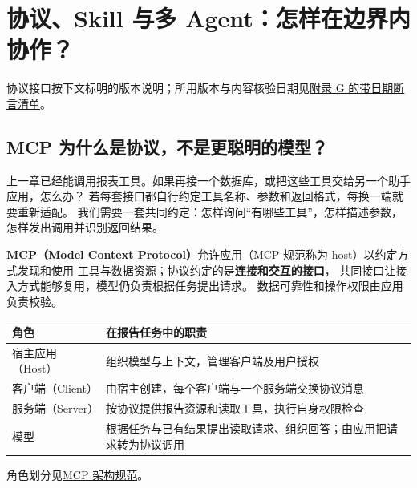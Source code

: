 \chapterrule
\section{协议、Skill 与多 Agent：怎样在边界内协作？}
\label{intro:23d-agent-protocols}
协议接口按下文标明的版本说明；所用版本与内容核验日期见\hyperref[app:dated-claims]{附录 G 的带日期断言清单}。

\subsection{MCP 为什么是协议，不是更聪明的模型？}
\label{concept:mcp}

上一章已经能调用报表工具。如果再接一个数据库，或把这些工具交给另一个助手应用，怎么办？
若每套接口都自行约定工具名称、参数和返回格式，每换一端就要重新适配。
我们需要一套共同约定：怎样询问“有哪些工具”，怎样描述参数，怎样发出调用并识别返回结果。

\textbf{MCP（Model Context Protocol）}允许应用（MCP 规范称为 host）以约定方式发现和使用
工具与数据资源；协议约定的是\textbf{连接和交互的接口}，
共同接口让接入方式能够复用，模型仍负责根据任务提出请求。
数据可靠性和操作权限由应用负责校验。

\begin{center}\small
{}
\begin{tabularx}{\linewidth}{@{}p{30mm}X@{}}\toprule
角色 & 在报告任务中的职责\\\midrule
宿主应用（Host） & 组织模型与上下文，管理客户端及用户授权\\
客户端（Client） & 由宿主创建，每个客户端与一个服务端交换协议消息\\
服务端（Server） & 按协议提供报告资源和读取工具，执行自身权限检查\\
模型 & 根据任务与已有结果提出读取请求、组织回答；由应用把请求转为协议调用\\\bottomrule
\end{tabularx}
\end{center}
角色划分见\href{https://modelcontextprotocol.io/specification/2026-07-28/architecture/index}{MCP 架构规范}。


